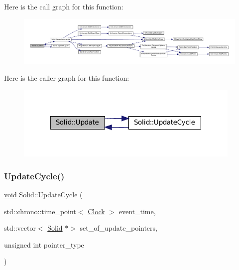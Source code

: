 Here is the call graph for this function\+:\nopagebreak
\begin{figure}[H]
\begin{center}
\leavevmode
\includegraphics[width=350pt]{class_solid_a248a5eab9fa0c584af7cdec2f86dc3a3_cgraph}
\end{center}
\end{figure}
Here is the caller graph for this function\+:\nopagebreak
\begin{figure}[H]
\begin{center}
\leavevmode
\includegraphics[width=307pt]{class_solid_a248a5eab9fa0c584af7cdec2f86dc3a3_icgraph}
\end{center}
\end{figure}
\mbox{\label{class_solid_a17239817eba0e5870454311857dca736}} 
\subsubsection{\texorpdfstring{Update\+Cycle()}{UpdateCycle()}}
{\footnotesize\ttfamily \mbox{\hyperlink{glad_8h_a950fc91edb4504f62f1c577bf4727c29}{void}} Solid\+::\+Update\+Cycle (\begin{DoxyParamCaption}\item[{std\+::chrono\+::time\+\_\+point$<$ \mbox{\hyperlink{universe_8h_a0ef8d951d1ca5ab3cfaf7ab4c7a6fd80}{Clock}} $>$}]{event\+\_\+time,  }\item[{std\+::vector$<$ \mbox{\hyperlink{class_solid}{Solid}} $\ast$$>$}]{set\+\_\+of\+\_\+update\+\_\+pointers,  }\item[{unsigned int}]{pointer\+\_\+type }\end{DoxyParamCaption})}



